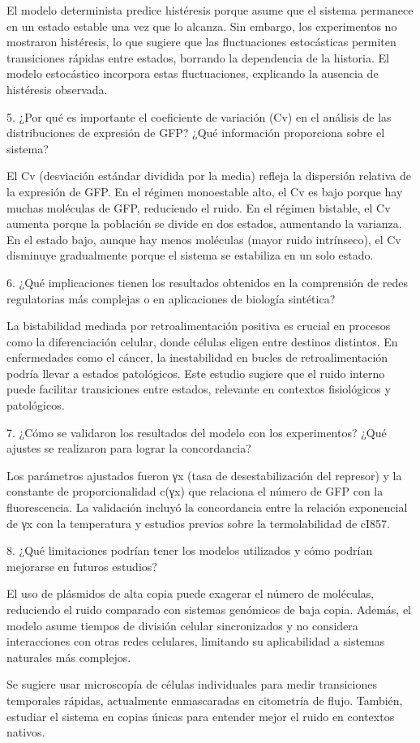 El modelo determinista predice histéresis porque asume que el sistema permanece en un estado estable una vez que lo alcanza. Sin embargo, los experimentos no mostraron histéresis, lo que sugiere que las fluctuaciones estocásticas permiten transiciones rápidas entre estados, borrando la dependencia de la historia. El modelo estocástico incorpora estas fluctuaciones, explicando la ausencia de histéresis observada.

5. ¿Por qué es importante el coeficiente de variación (Cv) en el análisis de las distribuciones de expresión de GFP? ¿Qué información proporciona sobre el sistema?

El Cv (desviación estándar dividida por la media) refleja la dispersión relativa de la expresión de GFP. En el régimen monoestable alto, el Cv es bajo porque hay muchas moléculas de GFP, reduciendo el ruido. En el régimen bistable, el Cv aumenta porque la población se divide en dos estados, aumentando la varianza. En el estado bajo, aunque hay menos moléculas (mayor ruido intrínseco), el Cv disminuye gradualmente porque el sistema se estabiliza en un solo estado.

6. ¿Qué implicaciones tienen los resultados obtenidos en la comprensión de redes regulatorias más complejas o en aplicaciones de biología sintética?

La bistabilidad mediada por retroalimentación positiva es crucial en procesos como la diferenciación celular, donde células eligen entre destinos distintos. En enfermedades como el cáncer, la inestabilidad en bucles de retroalimentación podría llevar a estados patológicos. Este estudio sugiere que el ruido interno puede facilitar transiciones entre estados, relevante en contextos fisiológicos y patológicos.

7. ¿Cómo se validaron los resultados del modelo con los experimentos? ¿Qué ajustes se realizaron para lograr la concordancia?

Los parámetros ajustados fueron γx (tasa de desestabilización del represor) y la constante de proporcionalidad c(γx) que relaciona el número de GFP con la fluorescencia. La validación incluyó la concordancia entre la relación exponencial de γx con la temperatura y estudios previos sobre la termolabilidad de cI857.

8. ¿Qué limitaciones podrían tener los modelos utilizados y cómo podrían mejorarse en futuros estudios?

El uso de plásmidos de alta copia puede exagerar el número de moléculas, reduciendo el ruido comparado con sistemas genómicos de baja copia. Además, el modelo asume tiempos de división celular sincronizados y no considera interacciones con otras redes celulares, limitando su aplicabilidad a sistemas naturales más complejos.

Se sugiere usar microscopía de células individuales para medir transiciones temporales rápidas, actualmente enmascaradas en citometría de flujo. También, estudiar el sistema en copias únicas para entender mejor el ruido en contextos nativos.


